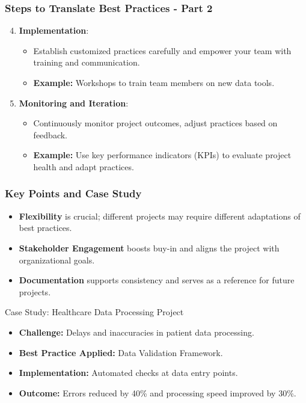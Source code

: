 \documentclass[aspectratio=169]{beamer}
\begin{document}
\begin{frame}[fragile]
    \frametitle{Steps to Translate Best Practices - Part 2}
    \begin{enumerate}
        \setcounter{enumi}{3} %
        \item \textbf{Implementation}:
            \begin{itemize}
                \item Establish customized practices carefully and empower your team with training and communication.
                \item \textbf{Example:} Workshops to train team members on new data tools.
            \end{itemize}

        \item \textbf{Monitoring and Iteration}:
            \begin{itemize}
                \item Continuously monitor project outcomes, adjust practices based on feedback.
                \item \textbf{Example:} Use key performance indicators (KPIs) to evaluate project health and adapt practices.
            \end{itemize}
    \end{enumerate}
\end{frame}

\begin{frame}[fragile]
    \frametitle{Key Points and Case Study}
    \begin{itemize}
        \item \textbf{Flexibility} is crucial; different projects may require different adaptations of best practices.
        \item \textbf{Stakeholder Engagement} boosts buy-in and aligns the project with organizational goals.
        \item \textbf{Documentation} supports consistency and serves as a reference for future projects.
    \end{itemize}

    \begin{block}{Case Study: Healthcare Data Processing Project}
        \begin{itemize}
            \item \textbf{Challenge:} Delays and inaccuracies in patient data processing.
            \item \textbf{Best Practice Applied:} Data Validation Framework.
            \item \textbf{Implementation:} Automated checks at data entry points.
            \item \textbf{Outcome:} Errors reduced by 40\% and processing speed improved by 30\%.
        \end{itemize}
    \end{block}
\end{frame}
\end{document}
